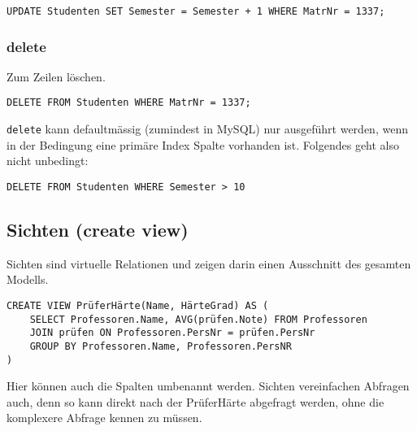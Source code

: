 \begin{lstlisting}[caption={update Beispiel}]
UPDATE Studenten SET Semester = Semester + 1 WHERE MatrNr = 1337;
\end{lstlisting}

\subsubsection{delete}
Zum Zeilen löschen.

\begin{lstlisting}[caption={delete Beispiel}]
DELETE FROM Studenten WHERE MatrNr = 1337;
\end{lstlisting}

\texttt{delete} kann defaultmässig (zumindest in MySQL) nur ausgeführt werden, wenn in der Bedingung eine primäre Index Spalte vorhanden ist. Folgendes geht also nicht unbedingt:

\begin{lstlisting}[caption={delete ohne Index}]
DELETE FROM Studenten WHERE Semester > 10
\end{lstlisting}

\subsection{Sichten (create view)}
Sichten sind virtuelle Relationen und zeigen darin einen Ausschnitt des gesamten Modells. 

\begin{lstlisting}[caption={Beispiel für eine Sicht}]
CREATE VIEW PrüferHärte(Name, HärteGrad) AS (   
    SELECT Professoren.Name, AVG(prüfen.Note) FROM Professoren
    JOIN prüfen ON Professoren.PersNr = prüfen.PersNr
    GROUP BY Professoren.Name, Professoren.PersNR
)
\end{lstlisting}

Hier können auch die Spalten umbenannt werden. Sichten vereinfachen Abfragen auch, denn so kann direkt nach der PrüferHärte abgefragt werden, ohne die komplexere Abfrage kennen zu müssen.

